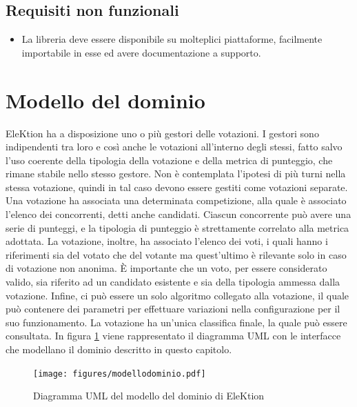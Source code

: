 \documentclass[12pt,a4paper,openright,twoside]{book}
\begin{document}
    \subsection{Requisiti non funzionali}
    \begin{itemize}
    \item{La libreria deve essere disponibile su molteplici piattaforme, facilmente importabile in esse ed avere documentazione
    a supporto.}
    \end{itemize}


\section{Modello del dominio}
\label{modellodominio}
EleKtion ha a disposizione uno o più gestori delle votazioni. 
I gestori sono indipendenti tra loro e così anche le votazioni all'interno degli stessi,
fatto salvo l'uso coerente della tipologia della votazione e della metrica di punteggio,
che rimane stabile nello stesso gestore.
Non è contemplata l'ipotesi di più turni nella stessa votazione, 
quindi in tal caso devono essere gestiti come votazioni separate.
Una votazione ha associata una determinata competizione, 
alla quale è associato l'elenco dei concorrenti, detti anche candidati. 
Ciascun concorrente può avere una serie di punteggi,
e la tipologia di punteggio è strettamente correlato alla metrica adottata.
La votazione, inoltre, ha associato l'elenco dei voti,
i quali hanno i riferimenti sia del votato che del votante
ma quest'ultimo è rilevante solo in caso di votazione non anonima.
È importante che un voto, per essere considerato valido, 
sia riferito ad un candidato esistente e sia della tipologia ammessa dalla votazione.
Infine, ci può essere un solo algoritmo collegato alla votazione,
il quale può contenere dei parametri per effettuare variazioni nella configurazione per il suo funzionamento.
La votazione ha un'unica classifica finale, la quale può essere consultata.
In figura \ref{fig:modellodominio} viene rappresentato il diagramma UML con le interfacce che modellano
il dominio descritto in questo capitolo.
\newpage
\begin{figure}

    
    \texttt{[image: figures/modellodominio.pdf]}
    \caption{Diagramma UML del modello del dominio di EleKtion}
   \label{fig:modellodominio}
\end{figure}

\end{document}
